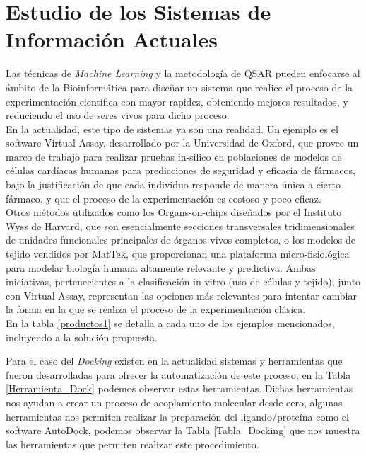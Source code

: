\section{Estudio de los Sistemas de Información Actuales}{
\noindent Las técnicas de \textit{Machine Learning} y la metodología de QSAR pueden enfocarse al ámbito de la Bioinformática para diseñar un sistema que realice el proceso de la experimentación científica con mayor rapidez, obteniendo mejores resultados, y reduciendo el uso de seres vivos para dicho proceso.\\

\noindent En la actualidad, este tipo de sistemas ya son una realidad. Un ejemplo es el software Virtual Assay, desarrollado por la Universidad de Oxford, que provee un marco de trabajo para realizar pruebas in-silico en poblaciones de modelos de células cardíacas humanas para predicciones de seguridad y eficacia de fármacos, bajo la justificación de que cada individuo responde de manera única a cierto fármaco, y que el proceso de la experimentación es costoso y poco eficaz.\\

\noindent Otros métodos utilizados como los Organs-on-chips diseñados por el Instituto Wyss de Harvard, que son esencialmente secciones transversales tridimensionales de unidades funcionales principales de órganos vivos completos, o los modelos de tejido vendidos por MatTek, que proporcionan una plataforma micro-fisiológica para modelar biología humana altamente relevante y predictiva. Ambas iniciativas, pertenecientes a la clasificación in-vitro (uso de células y tejido), junto con Virtual Assay, representan las opciones más relevantes para intentar cambiar la forma en la que se realiza el proceso de la experimentación clásica.\\

En la tabla \ref{productos1} se detalla a cada uno de los ejemplos mencionados, incluyendo a la solución propuesta.

\noindent Para el caso del \textit{Docking} existen en la actualidad sistemas y herramientas que fueron desarrolladas para ofrecer la automatización de este proceso, en la Tabla \ref{Herramienta_Dock} podemos observar estas herramientas.
Dichas herramientas nos ayudan a crear un proceso de acoplamiento molecular desde cero, algunas herramientas nos permiten realizar la preparación del ligando/proteína como el software AutoDock, podemos observar la Tabla \ref{Tabla_Docking} que nos muestra las herramientas que permiten realizar este procedimiento.

}
